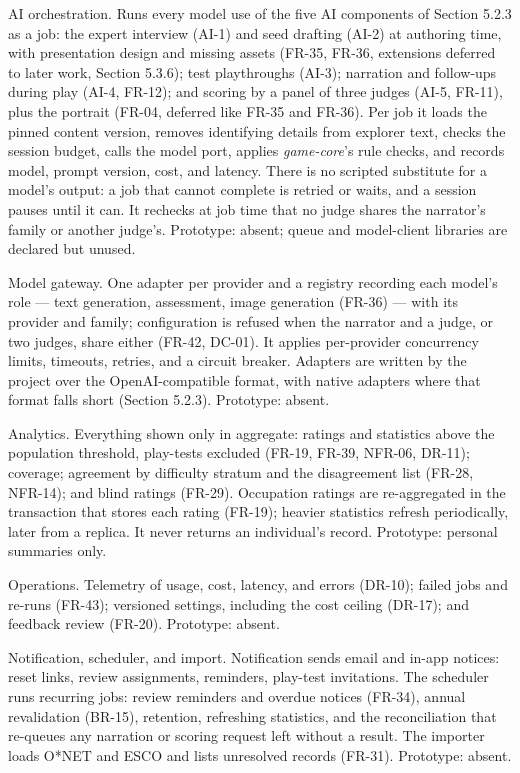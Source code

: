 AI orchestration. Runs every model use of the five AI components of Section 5.2.3 as a job: the expert interview (AI-1) and seed drafting (AI-2) at authoring time, with presentation design and missing assets (FR-35, FR-36, extensions deferred to later work, Section 5.3.6); test playthroughs (AI-3); narration and follow-ups during play (AI-4, FR-12); and scoring by a panel of three judges (AI-5, FR-11), plus the portrait (FR-04, deferred like FR-35 and FR-36). Per job it loads the pinned content version, removes identifying details from explorer text, checks the session budget, calls the model port, applies \textit{game-core}'s rule checks, and records model, prompt version, cost, and latency. There is no scripted substitute for a model's output: a job that cannot complete is retried or waits, and a session pauses until it can. It rechecks at job time that no judge shares the narrator's family or another judge's. Prototype: absent; queue and model-client libraries are declared but unused.

Model gateway. One adapter per provider and a registry recording each model's role --- text generation, assessment, image generation (FR-36) --- with its provider and family; configuration is refused when the narrator and a judge, or two judges, share either (FR-42, DC-01). It applies per-provider concurrency limits, timeouts, retries, and a circuit breaker. Adapters are written by the project over the OpenAI-compatible format, with native adapters where that format falls short (Section 5.2.3). Prototype: absent.

Analytics. Everything shown only in aggregate: ratings and statistics above the population threshold, play-tests excluded (FR-19, FR-39, NFR-06, DR-11); coverage; agreement by difficulty stratum and the disagreement list (FR-28, NFR-14); and blind ratings (FR-29). Occupation ratings are re-aggregated in the transaction that stores each rating (FR-19); heavier statistics refresh periodically, later from a replica. It never returns an individual's record. Prototype: personal summaries only.

Operations. Telemetry of usage, cost, latency, and errors (DR-10); failed jobs and re-runs (FR-43); versioned settings, including the cost ceiling (DR-17); and feedback review (FR-20). Prototype: absent.

Notification, scheduler, and import. Notification sends email and in-app notices: reset links, review assignments, reminders, play-test invitations. The scheduler runs recurring jobs: review reminders and overdue notices (FR-34), annual revalidation (BR-15), retention, refreshing statistics, and the reconciliation that re-queues any narration or scoring request left without a result. The importer loads O*NET and ESCO and lists unresolved records (FR-31). Prototype: absent.

